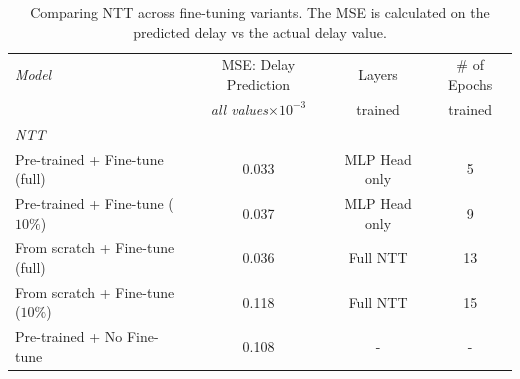 \begin{table}[htbp]
\centering
\begin{tabular}{ l   c   c  c }
\toprule
\emph{Model} &  MSE: Delay Prediction    & Layers  & 	\# of Epochs \\
			&		\emph{all values$\times10^{-3}$} 	& trained    	& trained \\ 
			

\midrule
\em{NTT}                                                               &                                             &   &  \\
    \smallindent Pre-trained  +   Fine-tune (full)                                  & 0.033                             & MLP Head only        & 5\\
    \smallindent Pre-trained  +   Fine-tune ($10\%$)                                  & 0.037                             & MLP Head only         & 9\\
    \smallindent From scratch  + Fine-tune (full)                                       & 0.036                             & Full NTT     & 13\\
     \smallindent From scratch  + Fine-tune ($10\%$)                                    & 0.118                             & Full NTT      &  15 \\
     \smallindent Pre-trained  +   No Fine-tune                                  & 0.108                             & -          & -\\
 
 \bottomrule

\end{tabular}
\caption{Comparing NTT across fine-tuning variants. The MSE is calculated on the predicted delay vs the actual delay value.}
\label{eval:table3}
\end{table}

